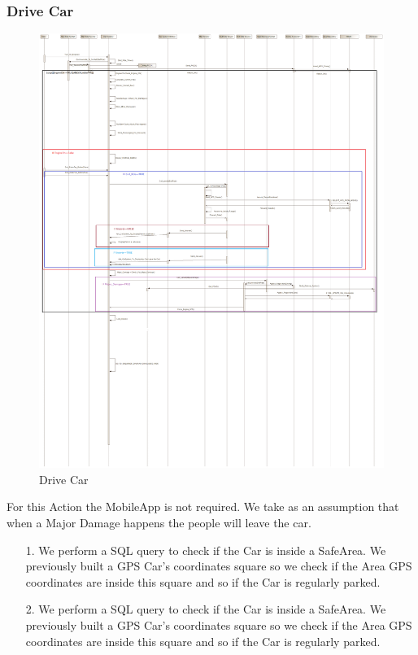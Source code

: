 \documentclass[12pt]{article}
\begin{document}
\subsubsection{Drive Car}
\begin{figure}[h]
	\centering
	\includegraphics[width=\textwidth]{../Images/Sequence_Final/Drive_Car}
	\caption{Drive Car}
\end{figure}
For this Action the MobileApp is not required.
We take as an assumption that when a Major Damage happens the people will leave the car.
\begin{enumerate}
	\item[1.] We perform a SQL query to check if the Car is inside a SafeArea. We previously built a GPS Car’s coordinates square so we check if the Area GPS coordinates are inside this square and so if the Car is regularly parked.
	\item[2.] We perform a SQL query to check if the Car is inside a SafeArea. We previously built a GPS Car’s coordinates square so we check if the Area GPS coordinates are inside this square and so if the Car is regularly parked.
\end{enumerate}
\clearpage
\end{document}
